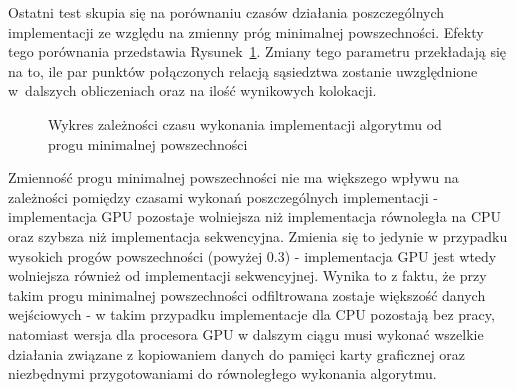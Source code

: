 \documentclass[12pt]{article}
\begin{document}
Ostatni test skupia się na porównaniu czasów działania poszczególnych implementacji ze względu na zmienny próg minimalnej powszechności. Efekty tego porównania przedstawia Rysunek~\ref{chart:minprev-sparse}. Zmiany tego parametru przekładają się na to, ile par punktów połączonych relacją sąsiedztwa zostanie uwzględnione w~dalszych obliczeniach oraz na ilość wynikowych kolokacji.

\begin{figure}[H]
\caption{Wykres zależności czasu wykonania implementacji algorytmu od progu minimalnej powszechności}
\label{chart:minprev-sparse}
\end{figure}

Zmienność progu minimalnej powszechności nie ma większego wpływu na zależności pomiędzy czasami wykonań poszczególnych implementacji - implementacja GPU pozostaje wolniejsza niż implementacja równoległa na CPU oraz szybsza niż implementacja sekwencyjna. Zmienia się to jedynie w przypadku wysokich progów powszechności (powyżej 0.3) - implementacja GPU jest wtedy wolniejsza również od implementacji sekwencyjnej. Wynika to z faktu, że przy takim progu minimalnej powszechności odfiltrowana zostaje większość danych wejściowych - w takim przypadku implementacje dla CPU pozostają bez pracy, natomiast wersja dla procesora GPU w dalszym ciągu musi wykonać wszelkie działania związane z kopiowaniem danych do pamięci karty graficznej oraz niezbędnymi przygotowaniami do równoległego wykonania algorytmu.
\end{document}
